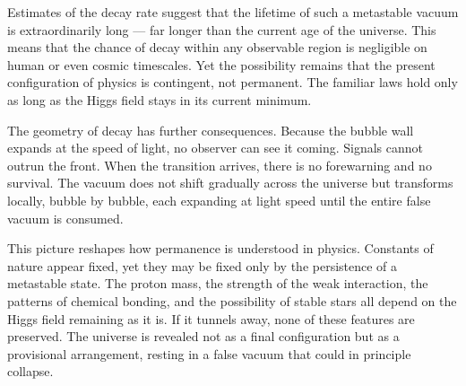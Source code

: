 \begin{phenomenon}
Estimates of the decay rate suggest that the lifetime of such a metastable vacuum is extraordinarily long — far longer than the current age of the universe. This means that the chance of decay within any observable region is negligible on human or even cosmic timescales. Yet the possibility remains that the present configuration of physics is contingent, not permanent. The familiar laws hold only as long as the Higgs field stays in its current minimum.

The geometry of decay has further consequences. Because the bubble wall expands at the speed of light, no observer can see it coming. Signals cannot outrun the front. When the transition arrives, there is no forewarning and no survival. The vacuum does not shift gradually across the universe but transforms locally, bubble by bubble, each expanding at light speed until the entire false vacuum is consumed.

This picture reshapes how permanence is understood in physics. Constants of nature appear fixed, yet they may be fixed only by the persistence of a metastable state. The proton mass, the strength of the weak interaction, the patterns of chemical bonding, and the possibility of stable stars all depend on the Higgs field remaining as it is. If it tunnels away, none of these features are preserved. The universe is revealed not as a final configuration but as a provisional arrangement, resting in a false vacuum that could in principle collapse.
\end{phenomenon}

